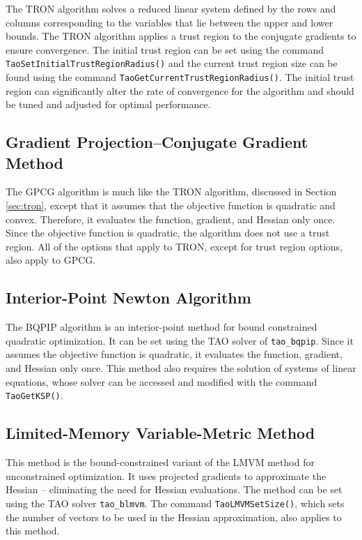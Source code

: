 The TRON algorithm solves a reduced linear system
defined by the rows and columns corresponding to the variables that
lie between the upper and lower bounds.
The TRON algorithm applies a trust region to the 
conjugate gradients to ensure convergence.  The initial trust region
can be set using the command 
{\tt Tao\-Set\-Initial\-Trust\-Region\-Radius()}
and the current trust region size can be found using the command
{\tt Tao\-Get\-Current\-Trust\-Region\-Radius()}.
The initial trust region can significantly alter the 
rate of convergence for the algorithm and should be
tuned and adjusted for optimal performance.


\subsection{Gradient Projection--Conjugate Gradient Method}
The GPCG \cite{more-toraldo} algorithm is much like the TRON algorithm, discussed in
Section \ref{sec:tron}, except that
it assumes that the objective function is quadratic and convex.
Therefore, it evaluates the function, gradient, and Hessian only
once.
Since the objective function
is quadratic, the algorithm does not use a trust region.  
All of the options that apply to TRON, except for trust region
options,  also apply to GPCG.

\subsection{Interior-Point Newton Algorithm}\label{sec:bqpip}
The BQPIP algorithm is an interior-point method for bound
constrained quadratic optimization.  It can be set using the
TAO solver of {\tt tao\_bqpip}.
Since it assumes the objective function is quadratic, 
it evaluates the function, gradient, and Hessian only once.
This method also requires the solution of systems of linear equations,
whose solver can be accessed and modified 
with the command {\tt Tao\-Get\-KSP()}.

\subsection{Limited-Memory Variable-Metric Method}

This method is the bound-constrained variant of the LMVM method for
unconstrained optimization.  It uses projected gradients to approximate
the Hessian -- eliminating the need for Hessian evaluations.
The method can be set using the TAO solver {\tt tao\_blmvm}.
The command {\tt Tao\-LMVM\-Set\-Size()}, which sets the number
of vectors to be used in the Hessian approximation, 
also applies to this method.

